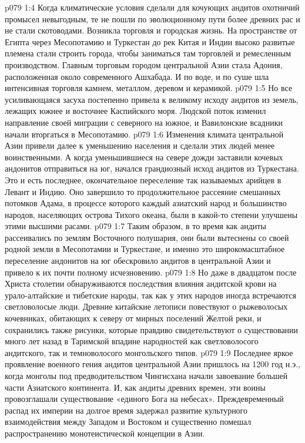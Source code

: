 \vs p079 1:4 Когда климатические условия сделали для кочующих андитов охотничий промысел невыгодным, те не пошли по эволюционному пути более древних рас и не стали скотоводами. Возникла торговля и городская жизнь. На пространстве от Египта через Месопотамию и Туркестан до рек Китая и Индии высоко развитые племена стали строить города, чтобы заниматься там торговлей и ремесленным производством. Главным торговым городом центральной Азии стала Адония, расположенная около современного Ашхабада. И по воде, и по суше шла интенсивная торговля камнем, металлом, деревом и керамикой.
\vs p079 1:5 Но все усиливающаяся засуха постепенно привела к великому исходу андитов из земель, лежащих южнее и восточнее Каспийского моря. Людской поток изменил направление своей миграции с северного на южное, и Вавилонские всадники начали вторгаться в Месопотамию.
\vs p079 1:6 Изменения климата центральной Азии привели далее к уменьшению населения и сделали этих людей менее воинственными. А когда уменьшившиеся на севере дожди заставили кочевых андонитов отправиться на юг, начался грандиозный исход андитов из Туркестана. Это и есть последнее, окончательное переселение так называемых арийцев в Левант и Индию. Оно завершило то продолжительное рассеяние смешанных потомков Адама, в процессе которого каждый азиатский народ и большинство народов, населяющих острова Тихого океана, были в какой\hyp{}то степени улучшены этими высшими расами.
\vs p079 1:7 Таким образом, в то время как андиты рассеивались по землям Восточного полушария, они были вытеснены со своей родной земли в Месопотамии и Туркестане, и именно это широкомасштабное переселение андонитов на юг обескровило андитов в центральной Азии и привело к их почти полному исчезновению.
\vs p079 1:8 Но даже в двадцатом после Христа столетии обнаруживаются последствия влияния андитской крови на урало\hyp{}алтайские и тибетские народы, так как у этих народов иногда встречаются светловолосые люди. Древние китайские летописи повествуют о рыжеволосых кочевниках, обитающих к северу от мирных поселений Желтой реки, и сохранились также рисунки, которые правдиво свидетельствуют о существовании много лет назад в Таримской впадине народностей как светловолосого андитского, так и темноволосого монгольского типов.
\vs p079 1:9 Последнее яркое проявление военного гения андитов центральной Азии пришлось на 1200 год н.э., когда монголы под предводительством Чингисхана начали завоевание большей части Азиатского континента. И, как андиты древних времен, эти воины провозглашали существование «единого Бога на небесах». Преждевременный распад их империи на долгое время задержал развитие культурного взаимодействия между Западом и Востоком и существенно помешал распространению монотеистической концепции в Азии.
